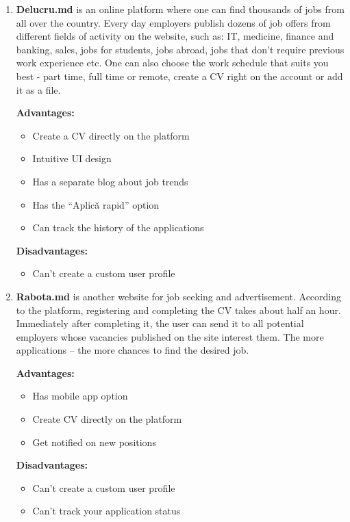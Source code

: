 \begin{enumerate}
    \item \textbf{Delucru.md} is an online platform where one can find thousands of jobs from all over the country. Every day employers publish dozens of job offers from different fields of activity on the website, such as: IT, medicine, finance and banking, sales, jobs for students, jobs abroad, jobs that don't require previous work experience etc. One can also choose the work schedule that suits you best - part time, full time or remote, create a CV right on the account or add it as a file.
    
    \textbf{Advantages:}
    \begin{itemize}
        \item Create a CV directly on the platform
        \item Intuitive UI design
        \item Has a separate blog about job trends
        \item Has the “Aplică rapid” option
        \item Can track the history of the applications
    \end{itemize}
    
    \textbf{Disadvantages:}
    \begin{itemize}
        \item Can’t create a custom user profile
    \end{itemize}
    
    
    \item \textbf{Rabota.md} is another website for job seeking and advertisement. According to the platform, registering and completing the CV takes about half an hour. Immediately after completing it, the user can send it to all potential employers whose vacancies published on the site interest them. The more applications – the more chances to find the desired job.
    
    \textbf{Advantages:}
    \begin{itemize}
        \item Has mobile app option
        \item Create CV directly on the platform
        \item Get notified on new positions
    \end{itemize}
    
    \textbf{Disadvantages:}
    \begin{itemize}
        \item Can’t create a custom user profile
        \item Can’t track your application status
    \end{itemize}
    

\end{enumerate}
